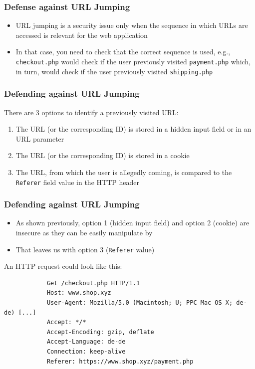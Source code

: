 \begin{frame}
    \frametitle{Defense against URL Jumping}
    \begin{itemize}
        \item URL jumping is a security issue only when the sequence in which URLs are accessed is relevant for the web application
        \item In that case, you need to check that the correct sequence is used, e.g., \texttt{checkout.php} would check if the user previously visited \texttt{payment.php} which, in turn, would check if the user previously visited \texttt{shipping.php}  
    \end{itemize}
\end{frame}

\begin{frame}
    \frametitle{Defending against URL Jumping}
    There are 3 options to identify a previously visited URL:
    \begin{enumerate}
        \item The URL (or the corresponding ID) is stored in a hidden input field or in an URL parameter
        \item The URL (or the corresponding ID) is stored in a cookie
        \item The URL, from which the user is allegedly coming, is compared to the \texttt{Referer} field value in the HTTP header 
    \end{enumerate}
\end{frame}

\begin{frame}[fragile]
    \frametitle{Defending against URL Jumping}
    \begin{itemize}
        \item As shown previously, option 1 (hidden input field) and option 2 (cookie) are insecure as they can be easily manipulate by \attacker
        \item That leaves us with option 3 (\texttt{Referer} value)
    \end{itemize}
    An HTTP request could look like this:
    \begin{center}
        \begin{verbatim}
            Get /checkout.php HTTP/1.1
            Host: www.shop.xyz
            User-Agent: Mozilla/5.0 (Macintosh; U; PPC Mac OS X; de-de) [...]
            Accept: */*
            Accept-Encoding: gzip, deflate
            Accept-Language: de-de
            Connection: keep-alive
            Referer: https://www.shop.xyz/payment.php
        \end{verbatim}
    \end{center}
\end{frame}

